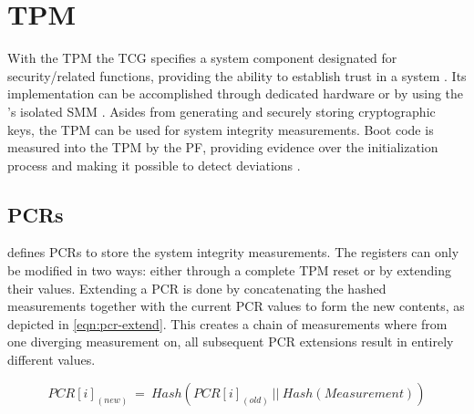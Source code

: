 
\chapter{\acf{TPM}}
\label{sec:tpm}

With the \ac{TPM} the \ac{TCG} specifies a system component designated for security\-/related functions, providing the ability to establish trust in a system \cite{microsoft-windows-trusted-platform-module-overview}.
Its implementation can be accomplished through dedicated hardware or by using the 's isolated \ac{SMM} \cite[Section 9.3]{tcg-tpm-library-part1-architecture}.
Asides from generating and securely storing cryptographic keys, the \ac{TPM} can be used for system integrity measurements.
Boot code is measured into the \ac{TPM} by the \ac{PF}, providing evidence over the initialization process and making it possible to detect deviations \cite{microsoft-windows-trusted-platform-module-overview}.

\section{\acfp{PCR}}
\label{sec:tpm:pcr}

\cite{tcg-tpm-library-part1-architecture} defines \acp{PCR} to store the system integrity measurements.
The registers can only be modified in two ways: either through a complete \ac{TPM} reset or by extending their values.
Extending a \ac{PCR} is done by concatenating the hashed measurements together with the current \ac{PCR} values to form the new contents, as depicted in \autoref{eqn:pcr-extend}.
This creates a chain of measurements where from one diverging measurement on, all subsequent \ac{PCR} extensions result in entirely different values.

\begin{equation}
    PCR[i]_{(new)}\:=\:Hash(PCR[i]_{(old)}\:||\:Hash(Measurement))
    \label{eqn:pcr-extend}
\end{equation}


